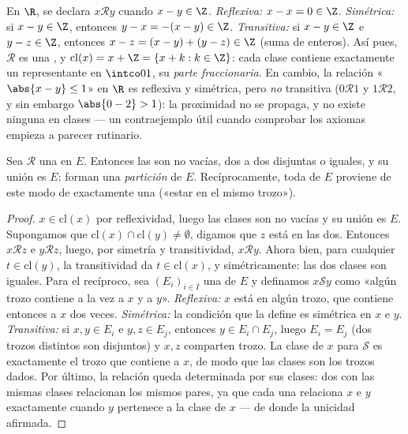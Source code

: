 \begin{example}\label{ex:b1:logic:fracpart}
En $\R$, se declara $x \mathbin{\mathcal{R}} y$ cuando $x - y \in \Z$.
\emph{Reflexiva:} $x - x = 0 \in \Z$. \emph{Simétrica:} si $x - y
\in \Z$, entonces $y - x = -(x - y) \in \Z$. \emph{Transitiva:} si $x -
y \in \Z$ e $y - z \in \Z$, entonces $x - z = (x - y) + (y - z) \in
\Z$ (suma de enteros). Así pues, $\mathcal R$ es una , y $\mathrm{cl}(x) = x + \Z = \{x + k : k \in \Z\}$: cada
clase contiene exactamente un representante en $\intco01$, su
\emph{parte fraccionaria}. En cambio, la relación «$\abs{x - y}
\leq 1$» en $\R$ es reflexiva y simétrica, pero \emph{no} transitiva
($0 \mathbin{\mathcal R} 1$ y $1 \mathbin{\mathcal R} 2$, y sin embargo
$\abs{0 - 2} > 1$): la proximidad no se propaga, y no existe ninguna
 en clases --- un contraejemplo útil cuando comprobar los
axiomas empieza a parecer rutinario.
\end{example}

\begin{theorem}\label{thm:b1:logic:partition}
Sea $\mathcal{R}$ una  en $E$. Entonces las
 son no vacías, dos a dos disjuntas o iguales, y
su unión es $E$: forman una \emph{partición} de $E$.
Recíprocamente, toda  de $E$ proviene de este modo de
exactamente una  («estar en el mismo trozo»).
\end{theorem}

\begin{proof}
$x \in \mathrm{cl}(x)$ por reflexividad, luego las clases son no vacías y
su unión es $E$. Supongamos que $\mathrm{cl}(x) \cap \mathrm{cl}(y) \neq
\emptyset$, digamos que $z$ está en las dos. Entonces
$x \mathbin{\mathcal{R}} z$ e $y \mathbin{\mathcal{R}} z$, luego, por
simetría y transitividad, $x \mathbin{\mathcal{R}} y$. Ahora bien, para
cualquier $t \in \mathrm{cl}(y)$, la transitividad da
$t \in \mathrm{cl}(x)$, y simétricamente: las dos clases son iguales.
Para el recíproco, sea $(E_i)_{i \in I}$ una  de $E$ y
definamos $x \mathbin{\mathcal S} y$ como «algún trozo contiene a la vez
a $x$ y a $y$». \emph{Reflexiva:} $x$ está en algún trozo, que
contiene entonces a $x$ dos veces. \emph{Simétrica:} la condición que
la define es simétrica en $x$ e $y$. \emph{Transitiva:} si
$x, y \in E_i$ e $y, z \in E_j$, entonces $y \in E_i \cap E_j$, luego
$E_i = E_j$ (dos trozos distintos son disjuntos) y $x, z$ comparten
trozo. La clase de $x$ para $\mathcal S$ es exactamente el trozo que
contiene a $x$, de modo que las clases son los trozos dados. Por último,
la relación queda determinada por sus clases: dos  con las mismas clases relacionan los mismos pares, ya que
cada una relaciona $x$ e $y$ exactamente cuando $y$ pertenece a la clase
de $x$ --- de donde la unicidad afirmada.
\end{proof}

